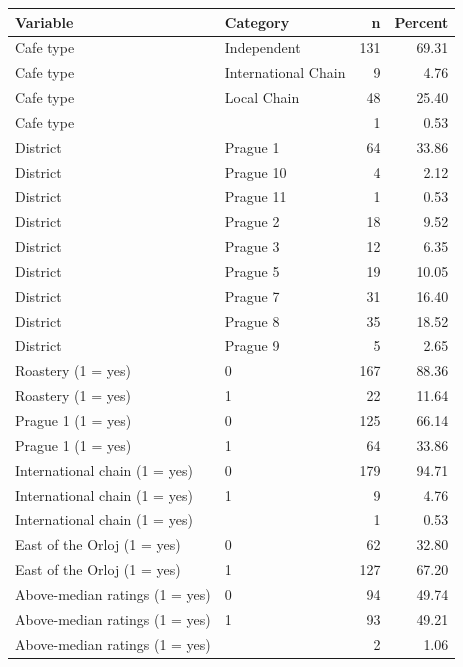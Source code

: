 \begingroup\footnotesize
\begin{tabular}{llrr}
  \toprule
Variable & Category & n & Percent \\ 
  \midrule
Cafe type & Independent & 131 & 69.31 \\ 
  Cafe type & International Chain &   9 & 4.76 \\ 
  Cafe type & Local Chain &  48 & 25.40 \\ 
  Cafe type &  &   1 & 0.53 \\ 
  District & Prague 1 &  64 & 33.86 \\ 
  District & Prague 10 &   4 & 2.12 \\ 
  District & Prague 11 &   1 & 0.53 \\ 
  District & Prague 2 &  18 & 9.52 \\ 
  District & Prague 3 &  12 & 6.35 \\ 
  District & Prague 5 &  19 & 10.05 \\ 
  District & Prague 7 &  31 & 16.40 \\ 
  District & Prague 8 &  35 & 18.52 \\ 
  District & Prague 9 &   5 & 2.65 \\ 
  Roastery (1 = yes) & 0 & 167 & 88.36 \\ 
  Roastery (1 = yes) & 1 &  22 & 11.64 \\ 
  Prague 1 (1 = yes) & 0 & 125 & 66.14 \\ 
  Prague 1 (1 = yes) & 1 &  64 & 33.86 \\ 
  International chain (1 = yes) & 0 & 179 & 94.71 \\ 
  International chain (1 = yes) & 1 &   9 & 4.76 \\ 
  International chain (1 = yes) &  &   1 & 0.53 \\ 
  East of the Orloj (1 = yes) & 0 &  62 & 32.80 \\ 
  East of the Orloj (1 = yes) & 1 & 127 & 67.20 \\ 
  Above-median ratings (1 = yes) & 0 &  94 & 49.74 \\ 
  Above-median ratings (1 = yes) & 1 &  93 & 49.21 \\ 
  Above-median ratings (1 = yes) &  &   2 & 1.06 \\ 
   \bottomrule
\end{tabular}
\endgroup
